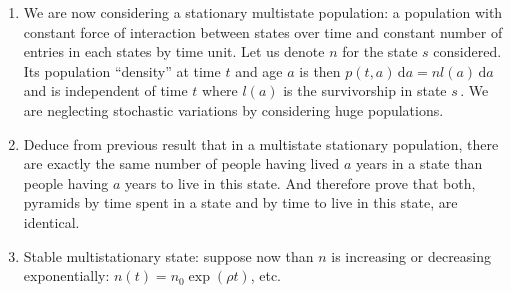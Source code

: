 \documentclass[11pt,a4paper]{article}
\def\D{{\,\mathrm d}}
\begin{document}
\begin{enumerate}
\item We are now considering a stationary multistate population: a
  population with constant force of interaction between states over
  time and constant number of entries in each states by time unit. Let
  us denote $n$ for the state $s$ considered. Its population
  ``density'' at time $t$ and age $a$ is then $p(t,a)\D a =nl(a) \D a$
  and is independent of time $t$ where $l(a)$ is the survivorship in
  state $s$\,. We are neglecting stochastic variations by considering
  huge populations.
\item Deduce from previous result that in a multistate stationary population,
  there are exactly the same number of people having lived $a$ years in a state
  than people having $a$ years to live in this state. And therefore prove that both,
  pyramids by time spent in a state and by time to live in this state, are identical.
\item Stable multistationary state: suppose now than $n$ is increasing or decreasing exponentially: $n(t)=n_0\exp(\rho t)$, etc.
\end{enumerate}
\end{document}
